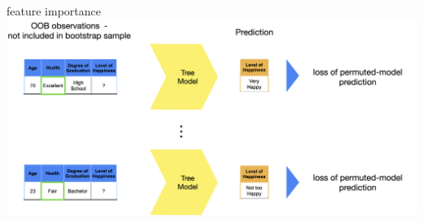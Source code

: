 \documentclass[11pt,compress,t,notes=noshow, xcolor=table]{beamer}
\begin{document}
\begin{vbframe}{feature importance}
\includegraphics[width = \textwidth]{slides/forests/figure_man/nutshell-randomforest-OOB_2.png}

\end{vbframe}



\endlecture
\end{document}
